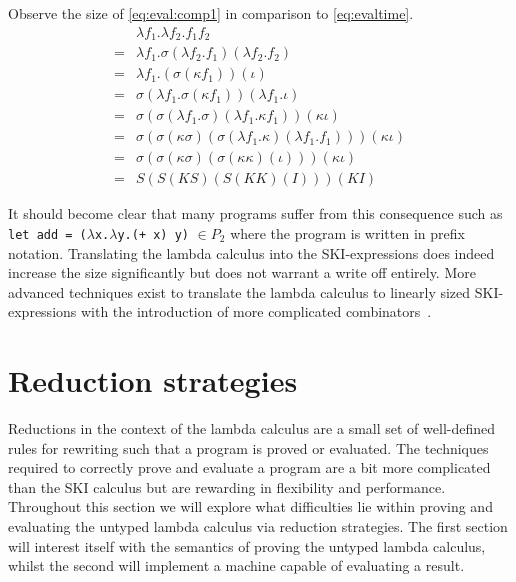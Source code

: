 \documentclass[11pt,oneside,a4paper]{report}
\begin{document}
\begin{exmp}
    Observe the size of \autoref{eq:eval:comp1} in comparison to \autoref{eq:evaltime}.
\begin{align}
    &\lambda f_1 . \lambda f_2 . f_1 f_2 \label{eq:eval:comp1}\\
    =&\lambda f_1 . \sigma(\lambda f_2 . f_1)(\lambda f_2 . f_2) \tag*{} \\
    =&\lambda f_1 . (\sigma(\kappa f_1))(\iota) \tag*{} \\
    =&\sigma (\lambda f_1 . \sigma (\kappa f_1)) (\lambda f_1 . \iota) \tag*{} \\
    =&\sigma (\sigma (\lambda f_1 . \sigma) (\lambda f_1 . \kappa f_1)) (\kappa \iota) \tag*{} \\
    =&\sigma (\sigma (\kappa \sigma) (\sigma (\lambda f_1 . \kappa) (\lambda f_1 . f_1))) (\kappa \iota) \tag*{} \\
    =&\sigma (\sigma (\kappa \sigma) (\sigma (\kappa \kappa) (\iota))) (\kappa \iota) \tag*{} \\
    =&S (S (K S) (S (K K) (I))) (K I) \tag*{}
\end{align}
\end{exmp}
It should become clear that many programs suffer from this consequence such as \texttt{let add = ($\lambda$x.$\lambda$y.(+ x) y)} $\in P_2$ where the program is written in prefix notation.
Translating the lambda calculus into the SKI-expressions does indeed increase the size significantly but does not warrant a write off entirely.
More advanced techniques exist to translate the lambda calculus to linearly sized SKI-expressions with the introduction of more complicated combinators~\cite{kiselyov2018lambda}.

\section{Reduction strategies}
Reductions in the context of the lambda calculus are a small set of well-defined rules for rewriting such that a program is proved or evaluated.
The techniques required to correctly prove and evaluate a program are a bit more complicated than the SKI calculus but are rewarding in flexibility and performance.
Throughout this section we will explore what difficulties lie within proving and evaluating the untyped lambda calculus via reduction strategies.
The first section will interest itself with the semantics of proving the untyped lambda calculus, whilst the second will implement a machine capable of evaluating a result.
\end{document}
